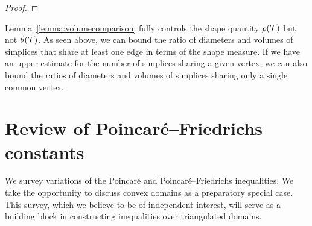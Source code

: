 \documentclass[10pt,letterpaper]{article}
\begin{document}
\begin{proof}
\end{proof}

\begin{remark}
    Lemma~\ref{lemma:volumecomparison} fully controls the shape quantity $\rho({\mathcal T})$ but not $\theta({\mathcal T})$. 
    As seen above, we can bound the ratio of diameters and volumes of simplices that share at least one edge in terms of the shape measure. 
    If we have an upper estimate for the number of simplices sharing a given vertex, 
    we can also bound the ratios of diameters and volumes of simplices sharing only a single common vertex. 
\end{remark}











































\section{Review of Poincar\'e--Friedrichs constants}\label{section:poincare}

We survey variations of the Poincar\'e and Poincar\'e--Friedrichs inequalities. 
We take the opportunity to discuss convex domains as a preparatory special case.
This survey, which we believe to be of independent interest, will serve as a building block in constructing inequalities over triangulated domains.
\\
\end{document}

